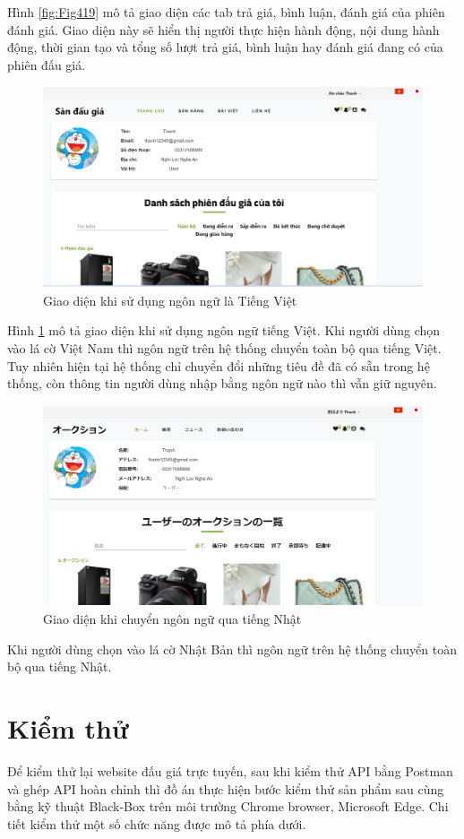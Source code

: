 \documentclass[../DoAn.tex]{subfiles}
\begin{document}
Hình \ref{fig:Fig419} mô tả giao diện các tab trả giá, bình luận, đánh giá của phiên đánh giá. Giao diện này sẽ hiển thị người thực hiện hành động, nội dung hành động, thời gian tạo và tổng số lượt trả giá, bình luận hay đánh giá đang có của phiên đấu giá. 
\begin{figure}[H]
    \centering
    \includegraphics[width=0.75\linewidth,height=5.95cm]{Hinhve/vietnamese.png}
    \caption{Giao diện khi sử dụng ngôn ngữ là Tiếng Việt}
    \label{fig:Fig420}
\end{figure}
Hình \ref{fig:Fig420} mô tả giao diện khi sử dụng ngôn ngữ tiếng Việt. Khi người dùng chọn vào lá cờ Việt Nam thì ngôn ngữ trên hệ thống chuyển toàn bộ qua tiếng Việt. Tuy nhiên hiện tại hệ thống chỉ chuyển đổi những tiêu đề đã có sẵn trong hệ thống, còn thông tin người dùng nhập bằng ngôn ngữ nào thì vẫn giữ nguyên.
\begin{figure}[H]
    \centering
    \includegraphics[width=0.75\linewidth,height=5.95cm]{Hinhve/jp.png}
    \caption{Giao diện khi chuyển ngôn ngữ qua tiếng Nhật}
    \label{fig:Fig421}
\end{figure}
Khi người dùng chọn vào lá cờ Nhật Bản thì ngôn ngữ trên hệ thống chuyển toàn bộ qua tiếng Nhật.
\section{Kiểm thử}
Để kiểm thử lại website đấu giá trực tuyến, sau khi kiểm thử API bằng Postman và ghép API hoàn chỉnh thì đồ án thực hiện bước kiểm thử sản phẩm sau cùng bằng kỹ thuật Black-Box trên môi trường Chrome browser, Microsoft Edge. Chi tiết kiểm thử một số chức năng được mô tả phía dưới. 
\end{document}
